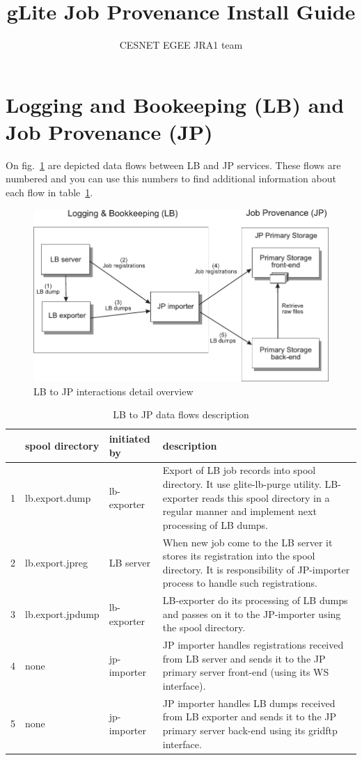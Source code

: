 \documentclass{egee}
\title{gLite Job Provenance Install Guide}
\author{CESNET EGEE JRA1 team}
\begin{document}
%
\tableofcontents
\newpage

\section{Logging and Bookeeping (LB) and Job Provenance (JP)}
On fig.~\ref{fig:LB-JP-interactions} are depicted data flows between
LB and JP services. These flows are numbered and you can use this
numbers to find additional information about each flow in
table~\ref{tab:LB-JP-interactions}.

\begin{figure}[htpb]
  \centering
  \includegraphics[width=0.9\hsize]{LB-JP-interaction-details}
  \caption{LB to JP interactions detail overview}
  \label{fig:LB-JP-interactions}
\end{figure}

\begin{table}[htpb]
 \centering
  \begin{tabular}{|c|l|l|p{9cm}|}
    \hline
    &spool directory&initiated by&description\\
    \hline
    \hline
    1&lb.export.dump&lb-exporter&Export of LB job records into spool 
    directory. It use glite-lb-purge utility. LB-exporter reads this
    spool directory
    in a regular manner and implement next processing of LB dumps.\\
    \hline
    2&lb.export.jpreg&LB server&When new job come to the LB server 
    it stores its
    registration into the spool directory. It is responsibility of
    JP-importer process to handle such registrations.\\
    \hline
    3&lb.export.jpdump&lb-exporter&LB-exporter do its processing of 
    LB dumps and passes
    on it to the JP-importer using the spool directory.\\
    \hline
    4&none&jp-importer&JP importer handles registrations received from LB
    server and sends it to the JP primary server front-end (using its WS
    interface).\\
    \hline
    5&none&jp-importer&JP importer handles LB dumps received from LB
    exporter and sends it to the JP primary server back-end using its
    gridftp interface.\\
    \hline
  \end{tabular}
  \caption{LB to JP data flows description}
  \label{tab:LB-JP-interactions}
\end{table}
\end{document}
